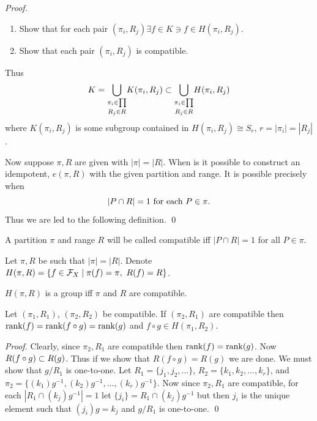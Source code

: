 \begin{proof}
\begin{enumerate}
\item[(a)] Show that for each pair $(\pi_i,R_j) \exists f \in K \ni
     f \in H(\pi_i,R_j)$.
\item[(b)] Show that each pair $(\pi_i,R_j)$ is compatible.
\end{enumerate}

     Thus
\[
     K = \underset{R_j \in R}{\bigcup_{\pi_i \in \prod}}
          K(\pi_i,R_j) \subset
          \underset{R_j \in R}{\bigcup_{\pi_i \in \prod}}
          H(\pi_i,R_j)
\]
where $K(\pi_i,R_j)$ is some subgroup contained in $H(\pi_i,R_j) \cong
S_r$, $r = |\pi_i| = |R_j|$.

     Now suppose $\pi,R$ are given with $|\pi| = |R|$.  When is it
possible to construct an idempotent, $e(\pi,R)$ with the given
partition and range.  It is possible precisely when
\[
     |P \cap R| = 1 \hbox{ for each } P \in \pi.
\]
Thus we are led to the following definition.
\qed
\end{proof}

\begin{definition}   \label{defn:2.6}
A partition $\pi$ and range $R$ will be called compatible if{f} $|P \cap R| = 1$ for all $P \in \pi$.
\end{definition}
  
  Let $\pi,R$ be such that $|\pi| = |R|$.
Denote $H(\pi,R) = \{ f \in \mathcal{F}_X \mid \pi(f) = \pi, \ R(f) = R \}$.


\begin{proposition} 	\label{prp:2.4}
$H(\pi,R)$ is a group if{f} $\pi$ and $R$ are compatible.
\end{proposition}

\begin{proposition} 	\label{prp:2.5}
Let $(\pi_1,R_1)$, $(\pi_2,R_2)$ be compatible.    
If $(\pi_2,R_1)$ are compatible then $\operatorname{rank}(f) = \operatorname{rank}(f \circ g) = \operatorname{rank}(g)$ and $f \circ g \in H(\pi_1,R_2)$.
\end{proposition}

\begin{proof} 
Clearly, since $\pi_2,R_1$ are compatible then $\operatorname{rank}(f) = \operatorname{rank}(g)$.  
Now $R(f \circ g) \subset R(g)$.  
Thus if we show that $R(f \circ g) = R(g)$ we are done.  
We must show that $g/R_1$ is one-to-one.  
Let $R_1 = \{j_1,j_2,\ldots\}$, $R_2 = \{ k_1,k_2,\ldots,k_r\}$, and $\pi_2 = \{ (k_1)g^{-1}, (k_2)g^{-1}, \ldots, (k_r)g^{-1} \}$.  
Now since $\pi_2,R_1$ are compatible, for each $|R_1 \cap (k_j)g^{-1}| = 1$ let $\{j_i\} = R_1 \cap (k_j)g^{-1}$ but then $j_i$ is the unique element such that $(j_i)g = k_j$ and $g/R_1$ is one-to-one.
\qed
\end{proof}

